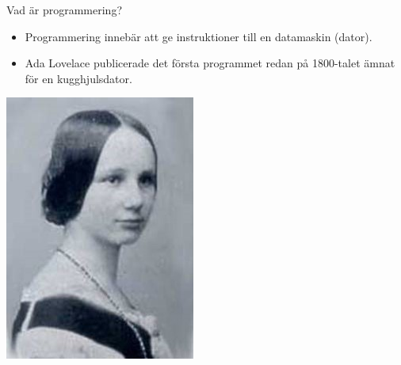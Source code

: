 \documentclass{simpleslides}
\begin{document}
\begin{Slide}{Vad är programmering?}
  \begin{itemize}
  \item Programmering innebär att ge instruktioner till en datamaskin (dator).
  \end{itemize}
  
  \begin{minipage}{.8\textwidth}
  \begin{itemize}
  \item Ada Lovelace publicerade det första programmet redan på 1800-talet ämnat för en kugghjulsdator.
  \end{itemize}
  \end{minipage}%
  \begin{minipage}{.2\textwidth}
  \centering\includegraphics[width=0.6\columnwidth]{../../img/ada}
  \end{minipage}%
  \end{Slide}
\end{document}
